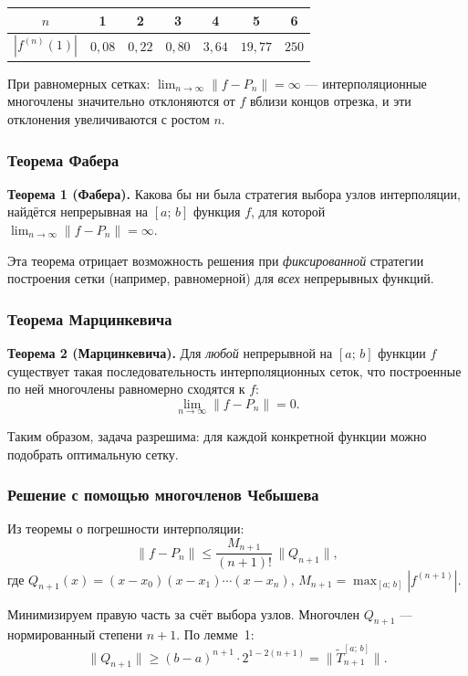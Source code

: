 \begin{center}
\begin{tabular}{c|cccccc}
    $n$ & 1 & 2 & 3 & 4 & 5 & 6 \\
    \hline
    $|f^{(n)}(1)|$ & $0{,}08$ & $0{,}22$ & $0{,}80$ & $3{,}64$ & $19{,}77$ & $250$
\end{tabular}
\end{center}

При равномерных сетках: $\displaystyle\lim_{n \to \infty} \|f - P_n\| = \infty$ --- интерполяционные многочлены значительно отклоняются от $f$ вблизи концов отрезка, и эти отклонения увеличиваются с ростом $n$.

\subsubsection*{Теорема Фабера}

\textbf{Теорема 1 (Фабера).} Какова бы ни была стратегия выбора узлов интерполяции, найдётся непрерывная на $[a;\,b]$ функция $f$, для которой $\displaystyle\lim_{n \to \infty} \|f - P_n\| = \infty$.

Эта теорема отрицает возможность решения при \textit{фиксированной} стратегии построения сетки (например, равномерной) для \textit{всех} непрерывных функций.

\subsubsection*{Теорема Марцинкевича}

\textbf{Теорема 2 (Марцинкевича).} Для \textit{любой} непрерывной на $[a;\,b]$ функции $f$ существует такая последовательность интерполяционных сеток, что построенные по ней многочлены равномерно сходятся к $f$:
\[
    \lim_{n \to \infty} \|f - P_n\| = 0.
\]

Таким образом, задача разрешима: для каждой конкретной функции можно подобрать оптимальную сетку.

\subsubsection*{Решение с помощью многочленов Чебышева}

Из теоремы о погрешности интерполяции:
\[
    \|f - P_n\| \leq \frac{M_{n+1}}{(n+1)!}\,\|Q_{n+1}\|,
\]
где $Q_{n+1}(x) = (x - x_0)(x - x_1)\cdots(x - x_n)$, $M_{n+1} = \max_{[a;\,b]} |f^{(n+1)}|$.

Минимизируем правую часть за счёт выбора узлов. Многочлен $Q_{n+1}$ --- нормированный степени $n+1$. По лемме~1:
\[
    \|Q_{n+1}\| \geq (b-a)^{n+1} \cdot 2^{1-2(n+1)} = \|\widetilde{T}_{n+1}^{[a;\,b]}\|.
\]

